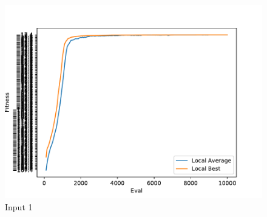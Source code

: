 \documentclass{standalone}
\begin{document}
\begin{figure}[!htb]
	\caption{Input 1}
	\label{fig:graph_1018}
	\includegraphics[width=\textwidth]{../graphs/graphs/1018.pdf}
\end{figure}
\end{document}
